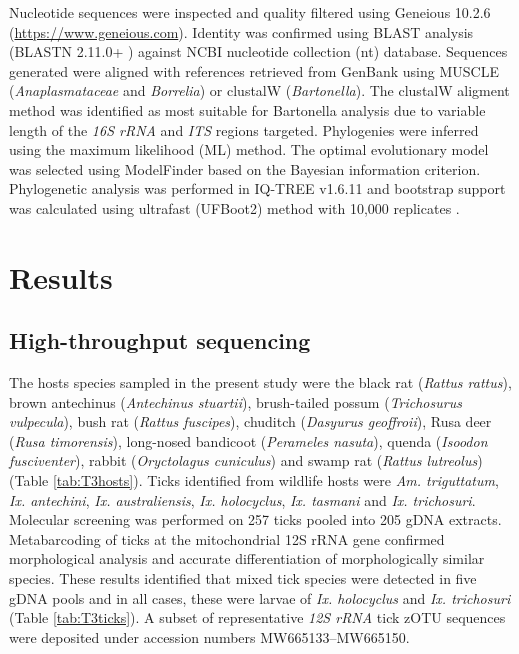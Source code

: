 \documentclass[a4paper, nobind]{templates/ociamthesis}
\begin{document}
Nucleotide sequences were inspected and quality filtered using Geneious 10.2.6 (\url{https://www.geneious.com}).
Identity was confirmed using BLAST analysis (BLASTN 2.11.0+ \autocite{zhangGreedyAlgorithmAligning2000,morgulisDatabaseIndexingProduction2008}) against NCBI nucleotide collection (nt) database.
Sequences generated were aligned with references retrieved from GenBank \autocite{bensonGenBank2017} using MUSCLE \autocite{edgarMUSCLEMultipleSequence2004} (\emph{Anaplasmataceae} and \emph{Borrelia}) or clustalW \autocite{larkinClustalClustalVersion2007} (\emph{Bartonella}).
The clustalW aligment method was identified as most suitable for Bartonella analysis due to variable length of the \emph{16S rRNA} and \emph{ITS} regions targeted.
Phylogenies were inferred using the maximum likelihood (ML) method.
The optimal evolutionary model was selected using ModelFinder \autocite{kalyaanamoorthyModelFinderFastModel2017} based on the Bayesian information criterion. Phylogenetic analysis was performed in IQ-TREE v1.6.11 \autocite{nguyenIQTREEFastEffective2015} and bootstrap support was calculated using ultrafast (UFBoot2) method with 10,000 replicates \autocite{hoangUFBoot2ImprovingUltrafast2018}.

\hypertarget{results}{%
\section{Results}\label{results}}

\hypertarget{high-throughput-sequencing}{%
\subsection{High-throughput sequencing}\label{high-throughput-sequencing}}

The hosts species sampled in the present study were the black rat (\emph{Rattus rattus}), brown antechinus (\emph{Antechinus stuartii}), brush-tailed possum (\emph{Trichosurus vulpecula}), bush rat (\emph{Rattus fuscipes}), chuditch (\emph{Dasyurus geoffroii}), Rusa deer (\emph{Rusa timorensis}), long-nosed bandicoot (\emph{Perameles nasuta}), quenda (\emph{Isoodon fusciventer}), rabbit (\emph{Oryctolagus cuniculus}) and swamp rat (\emph{Rattus lutreolus}) (Table \ref{tab:T3hosts}).
Ticks identified from wildlife hosts were \emph{Am. triguttatum}, \emph{Ix. antechini}, \emph{Ix. australiensis}, \emph{Ix. holocyclus}, \emph{Ix. tasmani} and \emph{Ix. trichosuri}.
Molecular screening was performed on 257 ticks pooled into 205 gDNA extracts.
Metabarcoding of ticks at the mitochondrial 12S rRNA gene confirmed morphological analysis and accurate differentiation of morphologically similar species.
These results identified that mixed tick species were detected in five gDNA pools and in all cases, these were larvae of \emph{Ix. holocyclus} and \emph{Ix. trichosuri} (Table \ref{tab:T3ticks}).
A subset of representative \emph{12S rRNA} tick zOTU sequences were deposited under accession numbers MW665133--MW665150.
\end{document}
